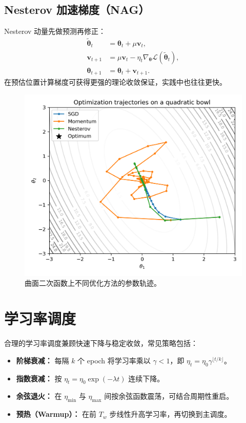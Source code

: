﻿\documentclass[UTF8,zihao=-4]{ctexart}
\begin{document}
\subsection{Nesterov 加速梯度（NAG）}
Nesterov 动量先做预测再修正：
\begin{align}
  \tilde{\boldsymbol{\theta}}_t &= \boldsymbol{\theta}_t + \mu \mathbf{v}_t, \\
  \mathbf{v}_{t+1} &= \mu \mathbf{v}_t - \eta_t \nabla_{\boldsymbol{\theta}} \mathcal{L}(\tilde{\boldsymbol{\theta}}_t), \\
  \boldsymbol{\theta}_{t+1} &= \boldsymbol{\theta}_t + \mathbf{v}_{t+1}.
\end{align}
在预估位置计算梯度可获得更强的理论收敛保证，实践中也往往更快。

\begin{figure}[H]
  \centering
  \includegraphics[width=0.8\linewidth]{optimization_trajectories.png}
  \caption{曲面二次函数上不同优化方法的参数轨迹。}
  \label{fig:optimization_trajectories_cn}
\end{figure}
\FloatBarrier

\section{学习率调度}
合理的学习率调度兼顾快速下降与稳定收敛，常见策略包括：

\begin{itemize}
  \item \textbf{阶梯衰减：} 每隔 $k$ 个 epoch 将学习率乘以 $\gamma<1$，即 $\eta_t = \eta_0 \gamma^{\lfloor t/k \rfloor}$。
  \item \textbf{指数衰减：} 按 $\eta_t = \eta_0 \exp(-\lambda t)$ 连续下降。
  \item \textbf{余弦退火：} 在 $\eta_{\min}$ 与 $\eta_{\max}$ 间按余弦函数震荡，可结合周期性重启。
  \item \textbf{预热（Warmup）：} 在前 $T_w$ 步线性升高学习率，再切换到主调度。
\end{itemize}
\end{document}
